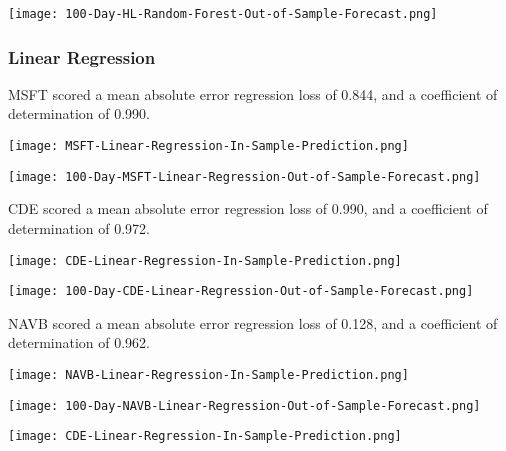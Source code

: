 \begin{center}  
    \texttt{[image: 100-Day-HL-Random-Forest-Out-of-Sample-Forecast.png]}
    \label{fig:nonfloat}
\end{center}

\subsubsection{Linear Regression}
MSFT scored a mean absolute error regression loss of 0.844, and a coefficient of determination of 0.990.

\begin{center}
    \texttt{[image: MSFT-Linear-Regression-In-Sample-Prediction.png]}
    \label{fig:nonfloat}
\end{center}

\begin{center}  
    \texttt{[image: 100-Day-MSFT-Linear-Regression-Out-of-Sample-Forecast.png]}
    \label{fig:nonfloat}
\end{center}

CDE scored a mean absolute error regression loss of 0.990, and a coefficient of determination of 0.972.

\begin{center}
    \texttt{[image: CDE-Linear-Regression-In-Sample-Prediction.png]}
    \label{fig:nonfloat}
\end{center}

\begin{center}  
    \texttt{[image: 100-Day-CDE-Linear-Regression-Out-of-Sample-Forecast.png]}
    \label{fig:nonfloat}
\end{center}

NAVB scored a mean absolute error regression loss of 0.128, and a coefficient of determination of 0.962.

\texttt{[image: NAVB-Linear-Regression-In-Sample-Prediction.png]}

\texttt{[image: 100-Day-NAVB-Linear-Regression-Out-of-Sample-Forecast.png]}

\begin{center}
    \texttt{[image: CDE-Linear-Regression-In-Sample-Prediction.png]}
    \label{fig:nonfloat}
\end{center}

